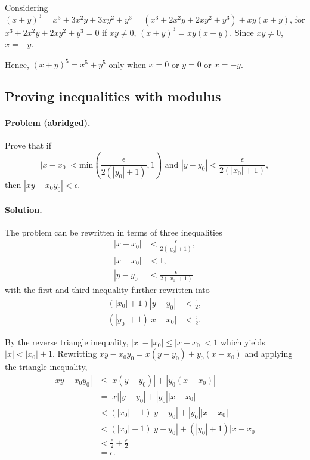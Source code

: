\documentclass{article}
\begin{document}
Considering $(x + y)^3 = x^3 + 3x^2y + 3xy^2 + y^3 = (x^3 + 2x^2y + 2xy^2 +
y^3) + xy(x + y)$, for $x^3 + 2x^2y + 2xy^2 + y^3 = 0$ if $xy \neq 0$, $(x +
y)^3 = xy(x + y)$. Since $xy \neq 0$, $x = -y$.

Hence, $(x + y)^5 = x^5 + y^5$ only when $x = 0$ or $y = 0$ or $x = -y$.

\setcounter{subsection}{20}
\subsection{Proving inequalities with modulus}

\paragraph{Problem (abridged).} Prove that if \begin{equation*}
  |x - x_0| < \text{min}\left(\frac{\epsilon}{2(|y_0| + 1)}, 1\right) \text{ and } |y
  - y_0| < \frac{\epsilon}{2(|x_0| + 1)},
\end{equation*} then $|xy - x_0y_0| < \epsilon$.

\paragraph{Solution.} The problem can be rewritten in terms of three
inequalities \begin{align*}
  |x - x_0| &< \frac{\epsilon}{2(|y_0| + 1)}, \\
  |x - x_0| &< 1, \\
  |y - y_0| &< \frac{\epsilon}{2(|x_0| + 1)}
\end{align*} with the first and third inequality further rewritten into
\begin{align*}
  (|x_0| + 1)|y - y_0| &< \frac{\epsilon}{2}, \\
  (|y_0| + 1)|x - x_0| &< \frac{\epsilon}{2}.
\end{align*}

By the reverse triangle inequality, $|x| - |x_0| \leq |x - x_0| < 1$ which
yields $|x| < |x_0| + 1$. Rewritting $xy - x_0y_0 = x(y - y_0) + y_0(x - x_0)$
and applying the triangle inequality, \begin{align*}
  |xy - x_0y_0| &\leq |x(y - y_0)| + |y_0(x - x_0)| \\
    &= |x||y - y_0| + |y_0||x - x_0| \\
    &< (|x_0| + 1)|y - y_0| + |y_0||x - x_0| \\
    &< (|x_0| + 1)|y - y_0| + (|y_0| + 1)|x - x_0| \\
    &< \frac{\epsilon}{2} + \frac{\epsilon}{2} \\
    &= \epsilon.
\end{align*}
\end{document}
